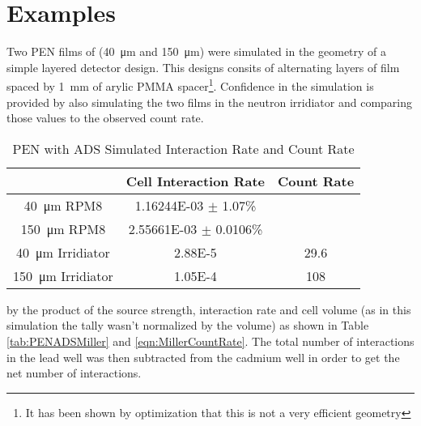 \documentclass[draftcls,onecolumn]{IEEEtran}
\begin{document}
\pagebreak
\section{Examples}
\begin{Exercise*}[label={PEN LiF with ADS},title={PEN LiF film with ADS},name={}]

Two PEN films of  (\SI{40}{\um} and \SI{150}{\um}) were simulated in the geometry of a simple layered detector design.
This designs consits of alternating layers of film spaced by \SI{1}{\mm} of arylic PMMA spacer\footnote{It has been shown by optimization that this is not a very efficient geometry}.
Confidence in the simulation is provided by also simulating the two films in the neutron irridiator and comparing those values to the observed count rate.
\begin{table}[h]
  \centering
  \caption{PEN with ADS Simulated Interaction Rate and Count Rate}
  \label{tab:PENADPerformace}
  \begin{tabular}{c | c c}
    & Cell Interaction Rate & Count Rate \\
    \hline
    \hline
   \SI{40}{\um}  RPM8 & \num{1.16244E-03} $\pm$ 1.07\% & \\
   \SI{150}{\um} RPM8 & \num{2.55661E-03} $\pm$ 0.0106\% & \\
   \hline
   \SI{40}{\um}  Irridiator & \num{2.88E-5} & 29.6 \\
   \SI{150}{\um} Irridiator & \num{1.05E-4} & 108 \\
  \end{tabular}
\end{table}

by the product of the source strength, interaction rate and cell volume (as in this simulation the tally wasn't normalized by the volume) as shown in Table \ref{tab:PENADSMiller} and \eqref{eqn:MillerCountRate}.
The total number of interactions in the lead well was then subtracted from the cadmium well in order to get the net number of interactions.


\end{Exercise*}


\end{document}
